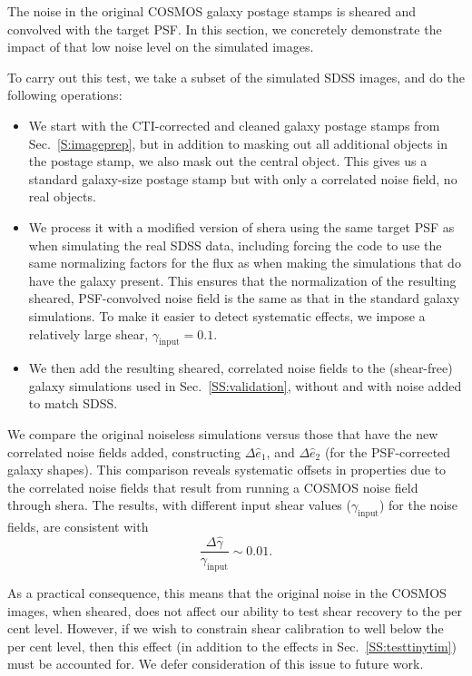 \documentclass[twocolumn,useAMS,usenatbib]{mn2e}
\newcommand{\beq}{\begin{equation}}
\newcommand{\eeq}{\end{equation}}
\newcommand{\newtext}{}
\begin{document}
\newtext{The noise in the original COSMOS galaxy postage stamps is sheared and
convolved with the target PSF.  In this section, we concretely
demonstrate the impact of that low noise level on the simulated
images.}

\newtext{To carry out this test, we take a subset of the simulated SDSS images,
and do the following operations:
\begin{itemize}
\item We start with the CTI-corrected and cleaned galaxy postage
  stamps from Sec.~\ref{S:imageprep}, but in addition to masking out
  all additional objects in the postage stamp, we also mask out the
  central object.  This gives us a standard galaxy-size postage stamp
  but with only a correlated noise field, no real objects.
\item We process it with a modified version of {\sc shera} using the
  same target PSF as when simulating the real SDSS data, including
  forcing the code to use the same normalizing factors for the flux as
  when making the simulations that do have the galaxy present.  This
  ensures that the normalization of the resulting sheared, PSF-convolved noise
  field is the same as that in the standard galaxy
  simulations.  To make it easier to detect systematic effects, we
  impose a relatively large shear, $\gamma_\mathrm{input}=0.1$.
\item We then add the resulting sheared, correlated noise fields to
  the (shear-free) galaxy simulations used in
  Sec.~\ref{SS:validation}, without and with noise added to match
  SDSS.
\end{itemize}
}

\newtext{We compare the original noiseless simulations versus
those that have the new correlated noise fields added, constructing $\Delta \hat{e}_1$, and $\Delta
\hat{e}_2$ (for the PSF-corrected galaxy shapes).  This comparison reveals systematic offsets in properties due to the
correlated noise fields that result from running a COSMOS noise field
through {\sc shera}.  The results, with different input shear values
($\gamma_\mathrm{input}$) 
for the noise fields, are consistent with 
}
\beq
\frac{\Delta\hat{\gamma}}{\gamma_\mathrm{input}} \sim 0.01.
\eeq

\newtext{As a practical consequence, this means that the original
  noise in the COSMOS images, when sheared, does not affect our
  ability to test shear recovery to the per cent level.  However, if we
wish to constrain shear calibration to well below the per cent level,
then this effect (in addition to the effects in
Sec.~\ref{SS:testtinytim}) must be accounted for.  We defer
consideration of this issue to future work.}
\end{document}
